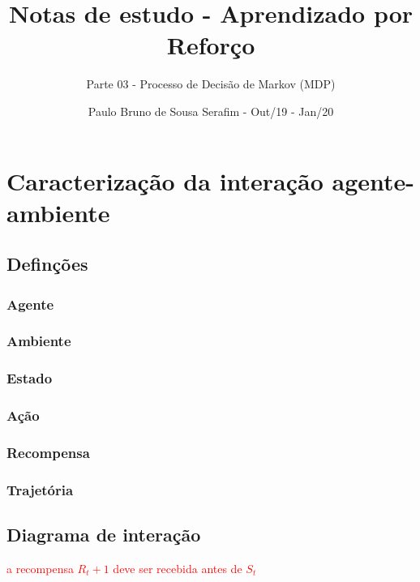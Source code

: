 \documentclass{article}
\title{Notas de estudo - Aprendizado por Reforço}
\author{Parte 03 - Processo de Decisão de Markov (MDP)}
\date{Paulo Bruno de Sousa Serafim - Out/19 - Jan/20}
\begin{document}
\maketitle

    \section{Caracterização da interação agente-ambiente}
    
        \subsection{Definções}
            
            \subsubsection{Agente}
            \subsubsection{Ambiente}
            \subsubsection{Estado}
            \subsubsection{Ação}
            \subsubsection{Recompensa}
            \subsubsection{Trajetória}
            
        \subsection{Diagrama de interação}
        
            \textcolor{red}{a recompensa $R_t+1$ deve ser recebida antes de $S_t$}
        
\end{document}
